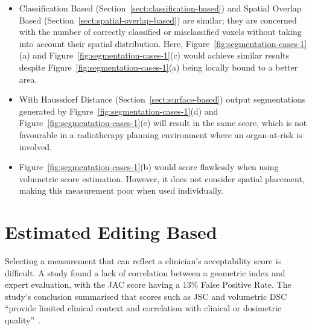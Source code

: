 \documentclass[11pt,twoside]{report}
\begin{document}
\begin{itemize}
  \item Classification Based (Section~\ref{sect:classification-based}) and Spatial Overlap Based (Section~\ref{sect:spatial-overlap-based}) are similar; they are concerned with the number of correctly classified or misclassified voxels without taking into account their spatial distribution. Here, Figure~\ref{fig:segmentation-cases-1}(a) and Figure~\ref{fig:segmentation-cases-1}(c) would achieve similar results despite Figure~\ref{fig:segmentation-cases-1}(a) being locally bound to a better area.
  \item With Haussdorf Distance (Section~\ref{sect:surface-based}) output segmentations generated by Figure~\ref{fig:segmentation-cases-1}(d) and Figure~\ref{fig:segmentation-cases-1}(e) will result in the same score, which is not favourable in a radiotherapy planning environment where an organ-at-risk is involved.
  \item Figure~\ref{fig:segmentation-cases-1}(b) would score flawlessly when using volumetric score estimation. However, it does not consider spatial placement, making this measurement poor when used individually.
\end{itemize}

\section{Estimated Editing Based}\label{sect:surface-dice}

Selecting a measurement that can reflect a clinician's acceptability score is difficult. A study found a lack of correlation between a geometric index and expert evaluation, with the JAC score having a 13\% False Positive Rate. The study's conclusion summarised that scores such as JSC and volumetric DSC ``provide limited clinical context and correlation with clinical or dosimetric quality''~\cite{Sherer2021-le}.

\end{document}
